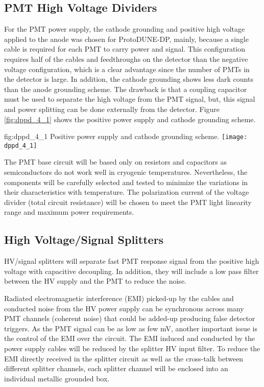 \subsection{PMT High Voltage Dividers}
\label{sec:fddp-pd-4.1}

For the PMT power supply, the cathode grounding and positive high voltage applied to the anode was chosen for ProtoDUNE-DP, mainly, because a single cable is required for each PMT to carry power and signal. This configuration requires half of the cables and feedthroughs on the detector than the negative voltage configuration, which is a clear advantage since the number of PMTs in the detector is large. In addition, the cathode grounding shows less dark counts than the anode grounding scheme. The drawback is that a coupling capacitor must be used to separate the high voltage from the PMT signal, but, this signal and power splitting can be done externally from the detector. Figure \ref{fig:dppd_4_1} shows the positive power supply and cathode grounding scheme.

\begin{dunefigure}{fig:dppd_4_1}
{Positive power supply and cathode grounding scheme.}
\texttt{[image: dppd\_4\_1]}
\end{dunefigure}

The PMT base circuit will be based only on resistors and capacitors as semiconductors do not work well in cryogenic temperatures. Nevertheless, the components will be carefully selected and tested to minimize the variations in their characteristics with temperature. The polarization current of the voltage divider (total circuit resistance) will be chosen to meet the PMT light linearity range and maximum power requirements.

\subsection{High Voltage/Signal Splitters}
\label{sec:fddp-pd-4.2}

HV/signal splitters will separate fast PMT response signal from the positive high voltage with capacitive decoupling. In addition, they will include a low pass filter between the HV supply and the PMT to reduce the noise.

Radiated electromagnetic interference (EMI) picked-up by the cables and conducted noise from the HV power supply can be synchronous across many PMT channels (coherent noise) that could be added-up producing false detector triggers. As the PMT signal can be as low as few mV, another important issue is the control of the EMI over the circuit. The EMI induced and conducted by the power supply cables will be reduced by the splitter HV input filter. To reduce the EMI directly received in the splitter circuit as well as the cross-talk between different splitter channels, each splitter channel will be enclosed into an individual metallic grounded box.

